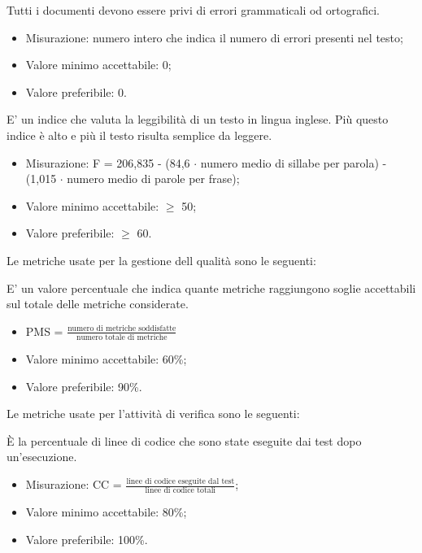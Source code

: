 		Tutti i documenti devono essere privi di errori grammaticali od ortografici.
		\begin{itemize}
			\item{Misurazione: numero intero che indica il numero di errori presenti nel testo;}
			\item{Valore minimo accettabile: 0;}
			\item{Valore preferibile: 0.}
		\end{itemize}
		
		E' un indice che valuta la leggibilità di un testo in lingua inglese. Più questo indice è alto e più il testo risulta semplice da leggere.
		 \begin{itemize}
			\item{Misurazione: F = 206,835 - (84,6 $\cdot$ numero medio di sillabe per parola) - (1,015 $\cdot$ numero medio di parole per frase);}
			\item{Valore minimo accettabile: $\geq$ 50;}
			\item{Valore preferibile: $\geq$ 60.}
		\end{itemize}

	Le metriche usate per la gestione dell qualità sono le seguenti:
	
		E' un valore percentuale che indica quante metriche raggiungono soglie accettabili sul totale delle metriche considerate.
		\begin{itemize}
			\item{PMS = $\displaystyle\frac{\mbox{numero di metriche soddisfatte}}{\mbox{numero totale di metriche}}$}
			\item{Valore minimo accettabile: 60\%;}
			\item{Valore preferibile: 90\%.}
		\end{itemize}
					
	Le metriche usate per l'attività di verifica sono le seguenti:
	
		 È la percentuale di linee di codice che sono state eseguite dai test dopo un’esecuzione.
		 \begin{itemize}
			\item{Misurazione: CC = $\displaystyle\frac{\mbox{linee di codice eseguite dal test}}{\mbox{linee di codice totali}}$;}
			\item{Valore minimo accettabile: 80\%;}
			\item{Valore preferibile: 100\%.}
		\end{itemize}

